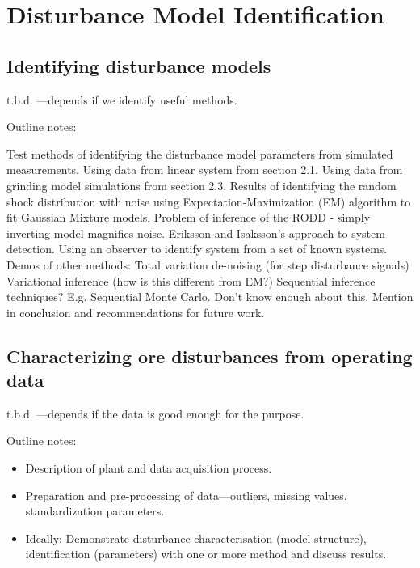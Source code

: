 \chapter{Disturbance Model Identification}
\label{chap-identification}

\section{Identifying disturbance models}

t.b.d. —depends if we identify useful methods.

Outline notes:
\begin{outline}
	\1 Test methods of identifying the disturbance model parameters from simulated measurements.
	\2 Using data from linear system from section 2.1.
	\2 Using data from grinding model simulations from section 2.3.
	\1 Results of identifying the random shock distribution with noise using Expectation-Maximization (EM) algorithm to fit Gaussian Mixture models.
	\1 Problem of inference of the RODD - simply inverting model magnifies noise.
	\1 Eriksson and Isaksson's approach to system detection. Using an observer to identify system from a set of known systems.
	\1 Demos of other methods:
	  \2 Total variation de-noising (for step disturbance signals)
	  \2 Variational inference (how is this different from EM?)
	\1 Sequential inference techniques? E.g. Sequential Monte Carlo. Don't know enough about this. Mention in conclusion and recommendations for future work.
\end{outline}

\section{Characterizing ore disturbances from operating data}

t.b.d. —depends if the data is good enough for the purpose.

Outline notes:
\begin{itemize}
	\item Description of plant and data acquisition process.
	\item Preparation and pre-processing of data—outliers, missing values, standardization parameters.
	\item Ideally: Demonstrate disturbance characterisation (model structure), identification (parameters) with one or more method and discuss results. 
\end{itemize}

